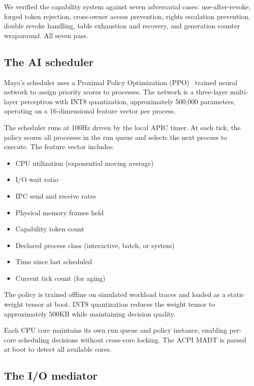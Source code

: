 \documentclass[letterpaper,twocolumn,10pt]{article}
\begin{document}
We verified the capability system against seven
adversarial cases: use-after-revoke, forged token
rejection, cross-owner access prevention, rights
escalation prevention, double revoke handling,
table exhaustion and recovery, and generation
counter wraparound. All seven pass.

\subsection{The AI scheduler}

Maya's scheduler uses a Proximal Policy
Optimization (PPO)~\cite{ppo} trained neural
network to assign priority scores to processes.
The network is a three-layer multi-layer
perceptron with INT8 quantization, approximately
500,000 parameters, operating on a 16-dimensional
feature vector per process.

The scheduler runs at 100Hz driven by the local
APIC timer. At each tick, the policy scores all
processes in the run queue and selects the next
process to execute. The feature vector includes:

\begin{itemize}
\item CPU utilization (exponential moving average)
\item I/O wait ratio
\item IPC send and receive rates
\item Physical memory frames held
\item Capability token count
\item Declared process class (interactive, batch,
  or system)
\item Time since last scheduled
\item Current tick count (for aging)
\end{itemize}

The policy is trained offline on simulated
workload traces and loaded as a static weight
tensor at boot. INT8 quantization reduces the
weight tensor to approximately 500KB while
maintaining decision quality.

Each CPU core maintains its own run queue
and policy instance, enabling per-core
scheduling decisions without cross-core
locking. The ACPI MADT is parsed at boot
to detect all available cores.

\subsection{The I/O mediator}
\end{document}

